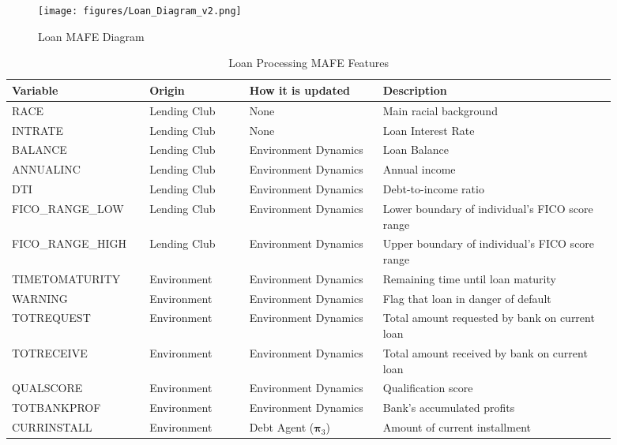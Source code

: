 \begin{figure*}[ht!]
    \centering
    \texttt{[image: figures/Loan\_Diagram\_v2.png]}
    \caption{Loan MAFE Diagram} 
    \label{fig:Loan_Diagram}
    \vspace{-0mm}
\end{figure*}

\begin{table*}[t]
\caption{Loan Processing MAFE Features}
\label{tab::Loan_indicators}
\centering
\begin{tabular}{ p{0.19\linewidth} || p{0.15\linewidth} || p{0.20\linewidth} || p{0.35\linewidth}}
 \hline
 Variable & Origin & How it is updated & Description\\
 \hline
  RACE & Lending Club & None& Main racial background\\  
 \hline
 INTRATE & Lending Club & None& Loan Interest Rate\\ 
 \hline
 BALANCE & Lending Club & Environment Dynamics& Loan Balance\\ 
 \hline
 ANNUALINC & Lending Club & Environment Dynamics & Annual income\\  
 \hline
 DTI & Lending Club & Environment Dynamics & Debt-to-income ratio\\
 \hline
 FICO\_RANGE\_LOW & Lending Club & Environment Dynamics & Lower boundary of individual's FICO score range\\ 
 \hline
 FICO\_RANGE\_HIGH & Lending Club & Environment Dynamics & Upper boundary of individual's FICO score range\\ 
 \hline
  TIMETOMATURITY & Environment& Environment Dynamics & Remaining time until loan maturity\\ 
 \hline
 WARNING & Environment & Environment Dynamics & Flag that loan in danger of default\\ 
 \hline
 TOTREQUEST & Environment & Environment Dynamics & Total amount requested by bank on current loan\\ 
\hline
 TOTRECEIVE & Environment & Environment Dynamics & Total amount received by bank on current loan\\
 \hline
 QUALSCORE & Environment & Environment Dynamics  & Qualification score\\
 \hline
 TOTBANKPROF & Environment & Environment Dynamics & Bank's accumulated profits\\
  \hline
 CURRINSTALL & Environment & Debt Agent ($\boldsymbol{\pi}_3$) & Amount of current installment\\ 
 \hline
\end{tabular}
\end{table*}
